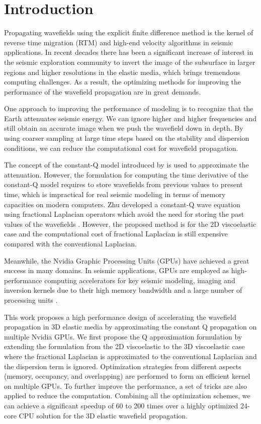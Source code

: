 \documentclass{paris17}
\begin{document}
\section{Introduction}

Propagating wavefields using the explicit finite difference method is the kernel of reverse time migration (RTM) and high-end velocity algorithms in seismic applications. In recent decades there has been a significant increase of interest in the seismic exploration community to invert the image of the subsurface in larger regions and higher resolutions in the elastic media, which brings tremendous computing challenges. As a result, the optimizing methods for improving the performance of the wavefield propagation are in great demands.

One approach to improving the performance of modeling is to recognize that the Earth attenuates seismic energy. We can ignore higher and higher frequencies and still obtain an accurate image\cite[]{Clapp.sep.111.bob3} when we push the wavefield down in depth. By using coarser sampling at large time steps based on the stability and dispersion conditions, we can reduce the computational cost for wavefield propagation. 

The concept of the constant-Q model introduced by \cite{Kjartansson.sep.23} is used to approximate the attenuation. However, the formulation for computing the time derivative of the constant-Q model requires to store wavefields from previous values to present time, which is impractical for real seismic modeling in terms of memory capacities on modern computers. Zhu developed a constant-Q wave equation using fractional Laplacian operators which avoid the need for storing the past values of the wavefields \cite[]{zhu2014theory,shen2013wave,shen2015image}. However, the proposed method is for the 2D viscoelastic case and the computational cost of fractional Laplacian is still expensive compared with the conventional Laplacian.

Meanwhile, the Nvidia Graphic Processing Units (GPUs)  have achieved a great success in many domains. In seismic applications, GPUs are employed as high-performance computing accelerators for key seismic modeling, imaging and inversion kernels due to their high memory bandwidth and a large number of processing units \cite[]{he2015gpu}.

This work proposes a high performance design of accelerating the wavefield propagation in 3D elastic media by approximating the constant Q propagation on multiple Nvidia GPUs. We first propose the Q approximation formulation by extending the formulation from the 2D viscoelastic to the 3D viscoelastic case where the fractional Laplacian is approximated to the conventional Laplacian and the dispersion term is ignored.  Optimization strategies from different aspects (memory, occupancy, and overlapping) are performed to form an efficient kernel on multiple GPUs. To further improve the performance, a set of tricks are also applied to reduce the computation. Combining all the optimization schemes, we can achieve a significant speedup of 60 to 200 times over a highly optimized 24-core CPU solution for the 3D elastic wavefield propagation.
\end{document}

